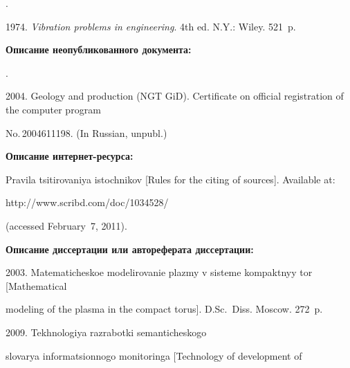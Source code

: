 {\begin{enumerate}[1.]
{\begin{enumerate}[1.]
.


1974. \textit{Vibration problems in engineering}. 4th ed. N.Y.: Wiley. 521~p.


\end{enumerate}








\noindent


\textbf{Описание неопубликованного документа:}





.


2004. Geology and production (NGT GiD). Certificate on official registration of the computer program


No.\,2004611198. (In Russian, unpubl.)





\noindent


\textbf{Описание интернет-ресурса:}








Pravila tsitirovaniya istochnikov [Rules for the citing of sources]. Available at: {\sf


http://www.scribd.com/doc/1034528/} (accessed February~7, 2011).










\noindent


\textbf{Описание диссертации или автореферата диссертации:}







2003. Matematicheskoe modelirovanie plazmy v sisteme kompaktnyy tor [Mathematical


modeling of the plasma in the compact torus]. D.Sc.\ Diss. Moscow. 272~p.





 2009. Tekhnologiya razrabotki semanticheskogo


slovarya informatsionnogo monitoringa [Technology of development of


}
\end{enumerate}}
